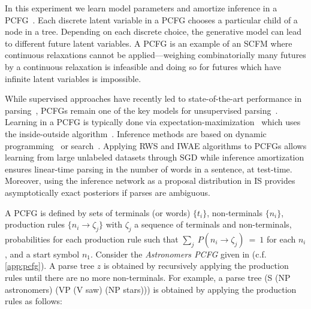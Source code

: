 In this experiment we learn model parameters and amortize inference in a \gls{PCFG}~\citep{Booth1973applying}.
Each discrete latent variable in a \gls{PCFG} chooses a particular child of a node in a tree.
Depending on each discrete choice, the generative model can lead to different future latent variables.
A \gls{PCFG} is an example of an \gls{SCFM} where continuous relaxations cannot be applied---weighing combinatorially many futures by a continuous relaxation is infeasible and doing so for futures which have infinite latent variables is impossible.

While supervised approaches have recently led to state-of-the-art performance in parsing~\citep{Chen2014fast}, \glspl{PCFG} remain one of the key models for unsupervised parsing~\citep{Manning1999foundations}.
Learning in a \gls{PCFG} is typically done via expectation-maximization~\citep{Dempster1977maximum} which uses the inside-outside algorithm~\citep{Lari1990estimation}.
Inference methods are based on dynamic programming~\citep{Younger1967recognition,Earley1970efficient} or search~\citep{Klein2003parsing}.
Applying \gls{RWS} and \gls{IWAE} algorithms to \glspl{PCFG} allows learning from large unlabeled datasets through \gls{SGD} while inference amortization ensures linear-time parsing in the number of words in a sentence, at test-time.
Moreover, using the inference network as a proposal distribution in \gls{IS} provides asymptotically exact posteriors if parses are ambiguous.

A \gls{PCFG} is defined by sets of terminals (or words) $\{t_i\}$, non-terminals $\{n_i\}$, production rules $\{n_i \to \zeta_j\}$ with $\zeta_j$ a sequence of terminals and non-terminals, probabilities for each production rule such that $\sum_j~P\left(n_i \!\to\! \zeta_j\right)~=~1$ for each $n_i$, and a start symbol $n_1$.
Consider the \emph{Astronomers \gls{PCFG}} given in \citet[Table
11.2]{Manning1999foundations} (c.f. \cref{app:pcfg}).
A parse tree $z$ is obtained by recursively applying the production rules until there are no more non-terminals.
For example, a parse tree (S (NP astronomers) (VP (V saw) (NP stars))) is obtained by applying the production rules as follows:

